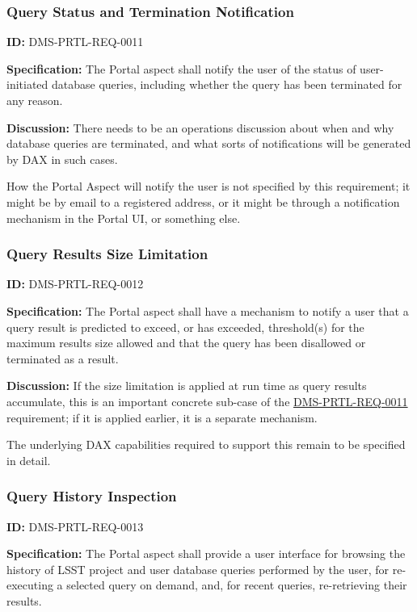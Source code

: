\documentclass[SE,toc]{lsstdoc}
\begin{document}
\subsubsection{Query Status and Termination Notification}

\label{DMS-PRTL-REQ-0011}
\textbf{ID:} DMS-PRTL-REQ-0011

\textbf{Specification:}
The Portal aspect shall notify the user of the status of user-initiated database queries, including whether the query has been terminated for any reason.

\textbf{Discussion:}
There needs to be an operations discussion about when and why database queries are terminated, and what sorts of notifications will be generated by DAX in such cases.

How the Portal Aspect will notify the user is not specified by this requirement; it might be by email to a registered address, or it might be through a notification mechanism in the Portal UI, or something else.

\subsubsection{Query Results Size Limitation}

\label{DMS-PRTL-REQ-0012}
\textbf{ID:} DMS-PRTL-REQ-0012

\textbf{Specification:}
The Portal aspect shall have a mechanism to notify a user that a query result is predicted to exceed, or has exceeded, threshold(s) for the maximum results size allowed and that the query has been disallowed or terminated as a result.

\textbf{Discussion:}
If the size limitation is applied at run time as query results accumulate, this is an important concrete sub-case of the \hyperref[DMS-PRTL-REQ-0011]{DMS-PRTL-REQ-0011} requirement; if it is applied earlier, it is a separate mechanism.

The underlying DAX capabilities required to support this remain to be specified in detail.

\subsubsection{Query History Inspection}

\label{DMS-PRTL-REQ-0013}
\textbf{ID:} DMS-PRTL-REQ-0013

\textbf{Specification:}
The Portal aspect shall provide a user interface for browsing the history of LSST project and user database queries performed by the user, for re-executing a selected query on demand, and, for recent queries, re-retrieving their results.
\end{document}
